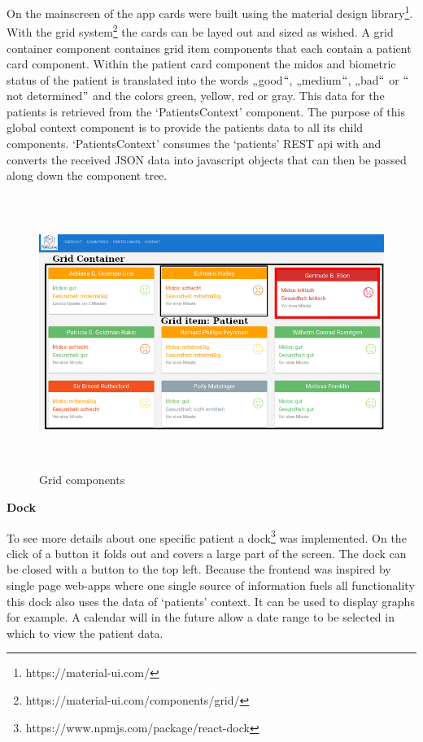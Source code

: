On the mainscreen of the app cards were built using the material design library\footnote{https://material-ui.com/}. With the grid system\footnote{https://material-ui.com/components/grid/} the cards can be layed out and sized as wished. A grid container component containes grid item components that each contain a patient card component. Within the patient card component the midos and biometric status of the patient is translated into the words „good$``$, „medium$``$, „bad$``$ or $``$not determined$"$  and the colors green, yellow, red or gray. This data for the patients is retrieved from the ‘PatientsContext’ component. The purpose of this global context component is to provide the patients data to all its child components. ‘PatientsContext’ consumes the ‘patients’ REST api with and converts the received JSON data into javascript objects that can then be passed along down the component tree. \\

\begin{figure}[h]
  \begin{center}
    \includegraphics[width=6.17in,height=3.5in]{./media/image5.png}
  \end{center}
  \caption{Grid components}
  \label{fig:helptext2}
\end{figure} 

\textbf{Dock}

To see more details about one specific patient a dock\footnote{https://www.npmjs.com/package/react-dock} was implemented. On the click of a button it folds out and covers a large part of the screen. The dock can be closed with a button to the top left. Because the frontend was inspired by single page web-apps where one single source of information fuels all functionality this dock also uses the data of ‘patients’ context. It can be used to display graphs for example. A calendar will in the future allow a date range to be selected in which to view the patient data. \\


